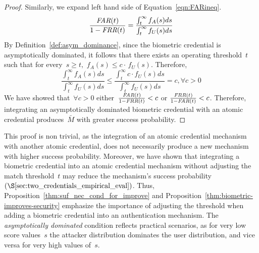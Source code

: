 \documentclass[conference,compsoc]{IEEEtran}
\begin{document}
\begin{proof}
Similarly, we expand left hand side of Equation~\ref{eqn:FARineq}. 
\begin{equation*}
\frac{\textit{FAR}(t)}{1-\textit{FRR}(t)} = \frac{\int_{t}^{\infty} f_A(s) ds}{\int_{t}^{\infty} f_U(s) ds}
\end{equation*}
By Definition~\ref{def:asym_dominance}, since the biometric credential is asymptotically dominated, it follows that there exists an operating threshold~$t$ such that for every~$s \ge t,$ $f_A(s) \le c\cdot\,f_U(s)$. Therefore,
\begin{equation*}
\frac{\int_{t}^{\infty} f_A(s) ds}{\int_{t}^{\infty} f_U(s) ds} \le \frac{\int_{t}^{\infty} c \cdot f_U(s) ds}{\int_{t}^{\infty} f_U(s) ds} = c, \forall c > 0
\end{equation*}
We have showed that~$\forall c>0$ either~$\frac{\textit{FAR}(t)}{1-\textit{FRR}(t)} < c$ or $\frac{\textit{FRR}(t)}{1-\textit{FAR}(t)} < c$. Therefore, integrating an asymptotically dominated biometric credential with an atomic credential produces~$\bar{M}$ with greater success probability.
\end{proof}

This proof is non trivial, as the integration of an atomic credential mechanism with another atomic credential, does not necessarily produce a new mechanism with higher success probability. Moreover, we have shown that integrating a biometric credential into an atomic credential mechanism without adjusting the match threshold~$t$ may reduce the mechanism's success probability~$(\S\ref{sec:two_credentials_empirical_eval})$. Thus, Proposition~\ref{thm:suf_nec_cond_for_improve} and Proposition~\ref{thm:biometric-improves-security} emphasize the importance of adjusting the threshold when adding a biometric credential into an authentication mechanism.
The \emph{asymptotically dominated} condition reflects practical scenarios, as for very low score values~$s$ the attacker distribution dominates the user distribution, and vice versa for very high values of~$s$.
\end{document}
